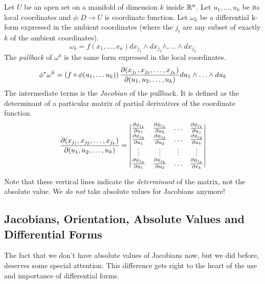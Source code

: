 \documentclass[fleqn,letterpaper]{report}
\begin{document}
\begin{defn}
Let $U$ be an open set on a manifold of dimension $k$ inside
$\mathbb{R}^n$. Let $u_1, \ldots, u_k$ be its local coordinates and
$\phi: D \rightarrow U$ is coordinate function. Let $\omega_k$
be a differential k-form expressed in the ambient coordinates
(where the $j_i$ are any subset of exactly $k$ of the ambient
coordinates).
\begin{equation*}
\omega_k = f(x_1, \ldots, x_n) dx_{j_1} \wedge dx_{j_2} \wedge, \ldots
\wedge dx_{j_k}
\end{equation*}
The \emph{pullback} of $\omega^k$ is the same form expressed
in the local coordinates.
\begin{equation*}
\phi^* \omega^k = \left(f \circ \phi(u_1, \ldots u_k) \right) 
\frac{\partial(x_{j_1}, x_{j_2}, \ldots, x_{j_k})}{\partial(u_1, u_2,
\ldots, u_k)} du_1 \wedge \ldots \wedge du_k
\end{equation*}
The intermediate terms is the \emph{Jacobian} of the pullback.
It is defined as the determinant of a particular matrix of
partial derivatives of the coordinate function.
\begin{equation*}
\frac{\partial(x_{j_1}, x_{j_2}, \ldots, x_{j_k})}{\partial(u_1, u_2,
\ldots, u_k)} = \left| \begin{matrix}
\frac{\partial \phi_{j_1}}{\partial u_1} & 
\frac{\partial \phi_{j_1}}{\partial u_2} & 
\ldots & 
\frac{\partial \phi_{j_1}}{\partial u_j} \\
\frac{\partial \phi_{j_2}}{\partial u_1} & 
\frac{\partial \phi_{j_2}}{\partial u_2} & 
\ldots & 
\frac{\partial \phi_{j_2}}{\partial u_k} \\
\vdots & \vdots & \vdots & \vdots \\
\frac{\partial \phi_{j_k}}{\partial u_1} & 
\frac{\partial \phi_{j_k}}{\partial u_2} & 
\ldots & 
\frac{\partial \phi_{j_k}}{\partial x_k} \end{matrix} \right|
\end{equation*}
\end{defn}
Note that these vertical lines indicate the \emph{determinant}
of the matrix, not the absolute value. We \emph{do not} take
absolute values for Jacobians anymore!

\subsection{Jacobians, Orientation, Absolute Values and
Differential Forms}
\label{jacobians}

The fact that we don't have absolute values of Jacobians now,
but we did before, deserves some special attention. This
difference gets right to the heart of the use and importance of
differential forms.
\end{document}
